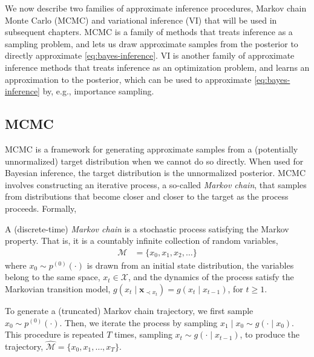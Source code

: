 We now describe two families of approximate inference procedures, Markov chain Monte Carlo (MCMC) and variational inference (VI) that will be used in subsequent chapters. MCMC is a family of methods that treats inference as a sampling problem, and lets us draw approximate samples from the posterior to directly approximate \eqref{eq:bayes-inference}. VI is another family of approximate inference methods that treats inference as an optimization problem, and learns an approximation to the posterior, which can be used to approximate \eqref{eq:bayes-inference} by, e.g., importance sampling.

\subsection{MCMC}
MCMC \citep[Ch 12.3]{andrieu2003introduction, KollerFriedman2009} is a framework for generating approximate samples from a (potentially unnormalized) target distribution when we cannot do so directly. When used for Bayesian inference, the target distribution is the unnormalized posterior. MCMC involves constructing an iterative process, a so-called \emph{Markov chain}, that samples from distributions that become closer and closer to the target as the process proceeds. Formally,
\begin{definition}
	A (discrete-time) \emph{Markov chain} is a stochastic process satisfying the Markov property. That is, it is a countably infinite collection of random variables,
	\begin{align*}
		\mathcal{M} &= \{x_0,x_1,x_2,\ldots\}
	\end{align*}
	where $x_0\sim p^{(0)}(\cdot)$ is drawn from an initial state distribution, the variables belong to the same space, $x_t\in\mathcal{X}$, and the dynamics of the process satisfy the Markovian transition model, $g(x_t\mid \mathbf{x}_{\prec x_t})=g(x_t\mid x_{t-1})$, for $t\ge1$.
\end{definition}
To generate a (truncated) Markov chain trajectory, we first sample $x_0\sim p^{(0)}(\cdot)$. Then, we iterate the process by sampling $x_1\mid x_0\sim g(\cdot\mid x_0)$. This procedure is repeated $T$ times, sampling $x_t\sim g(\cdot\mid x_{t-1})$, to produce the trajectory, $\hat{\mathcal{M}}=\{x_0,x_1,\ldots,x_T\}$.

